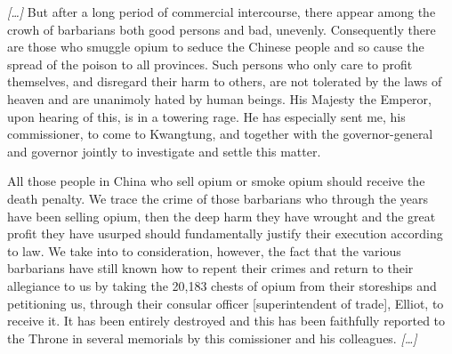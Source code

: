 \begin{fancyquote}
	\emph{[\ldots]} But after a long period of commercial intercourse, there appear among the crowh of barbarians both good persons and bad, unevenly. Consequently there are those who smuggle opium to seduce the Chinese people and so cause the spread of the poison to all provinces. Such persons who only care to profit themselves, and disregard their harm to others, are not tolerated by the laws of heaven and are unanimoly hated by human beings. His Majesty the Emperor, upon hearing of this, is in a towering rage. He has especially sent me, his commissioner, to come to Kwangtung, and together with the governor-general and governor jointly to investigate and settle this matter.\par
	All those people in China who sell opium or smoke opium should receive the death penalty. We trace the crime of those barbarians who through the years have been selling opium, then the deep harm they have wrought and the great profit they have usurped should fundamentally justify their execution according to law. We take into to consideration, however, the fact that the various barbarians have still known how to repent their crimes and return to their allegiance to us by taking the 20,183 chests of opium from their storeships and petitioning us, through their consular officer [superintendent of trade], Elliot, to receive it. It has been entirely destroyed and this has been faithfully reported to the Throne in several memorials by this comissioner and his colleagues. \emph{[\ldots]}
	\begin{flushright}
		\emph{\autocite{Teng:1979}}
	\end{flushright}
\end{fancyquote}
